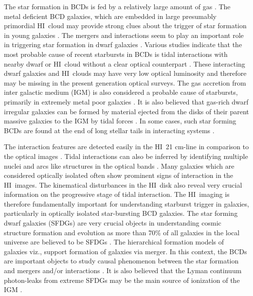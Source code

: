\documentclass[useAMS,usenatbib]{mn2e}
\def\HI{H{\small{I}}~}
\begin{document}
The star formation in BCDs is fed by a relatively large amount of gas \citep{1981ApJ...247..823T,1992MNRAS.258..334S,1998AJ....116.1186V}. The metal deficient BCD galaxies, which are embedded in large presumably primordial \HI cloud may provide strong clues about the trigger of star formation in young galaxies \citep{1995ApJ...445..108T,1999ApJ...527..757I,2010MNRAS.403..295E}. The mergers and interactions seem to play an important role in triggering star formation in dwarf galaxies \citep{2013seg..book..555S,2014Natur.507..335A,2014ApJ...794..115D}. Various studies indicate that the most probable cause of recent starbursts in BCDs is tidal interactions with nearby dwarf or \HI cloud without a clear optical counterpart \citep{2001A&A...371..806N,2001A&A...374..800O,2001ApSSS.277..445P,2008MNRAS.388L..10B,
2008MNRAS.391..881E,2010MNRAS.403..295E,2016MNRAS.462...92J}. These interacting dwarf galaxies and \HI clouds may have very low optical luminosity and therefore may be missing in the present generation optical surveys. The gas accretion from inter galactic medium (IGM) is also considered a probable cause of starbursts, primarily in extremely metal poor galaxies \citep{1999ApJ...514...77N,2006MNRAS.370.1445D,2009ApJ...703..785D,2012RAA....12..917S}. It is also believed that gas-rich dwarf irregular galaxies can be formed by material ejected from the disks of their parent massive galaxies to the IGM by tidal forces \citep{2000ApJ...543..149O}. In some cases, such star forming BCDs are found at the end of long stellar tails in interacting systems \citep{2004A&A...427..803D,2007A&A...475..187D}. 

The interaction features are detected easily in the \HI 21 cm-line in comparison to the optical images \citep{2010A&A...521A..63L,2012MNRAS.419.1051L,2014A&A...566A..71L,2015ApJ...815L..17M}. Tidal interactions can also be inferred  by identifying multiple nuclei and arcs like structures in the optical bands \citep{1993ApJS...85...27M}. Many galaxies which are considered optically isolated often show prominent signs of interaction in the \HI images. The kinematical disturbances in the \HI disk also reveal very crucial information on the progressive stage of tidal interaction. The \HI imaging is therefore fundamentally important for understanding starburst trigger in galaxies, particularly in optically isolated star-bursting BCD galaxies. The star forming dwarf galaxies (SFDGs) are very crucial objects in understanding cosmic structure formation and evolution as more than 70\% of all galaxies in the local universe are believed to be SFDGs \citep{2004AJ....127.2031K}. The hierarchical formation models of galaxies viz., \citet{1997MNRAS.286..795K} support formation of galaxies via merger. In this context, the BCDs are important objects to study causal phenomenon between the star formation and mergers and/or interactions \citep{2004AJ....127..264B,2008MNRAS.388L..10B,2012MNRAS.419.1051L,2014AJ....148..130A}. It is also believed that the Lyman continuum photon-leaks from extreme SFDGs may be the main source of ionization of the IGM \citep{2009ApJ...693..984W,2013A&A...553A.106L,2013MNRAS.428L...1M,2014Sci...346..216B,2016Natur.529..178I}. 
\end{document}
